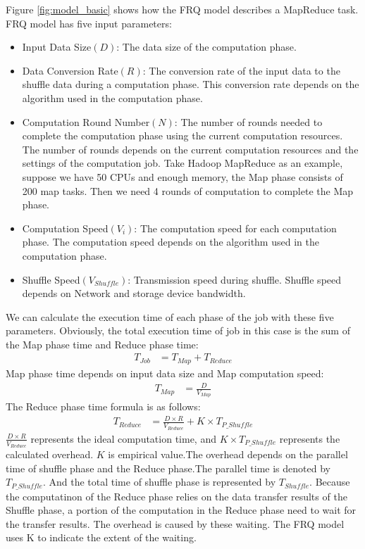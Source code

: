 {Figure \ref{fig:model_basic} shows how the FRQ model describes a MapReduce task. FRQ model has five input parameters:
\begin{itemize}
	\item Input Data Size\((D)\): The data size of the computation phase.
	\item Data Conversion Rate\((R)\): The conversion rate of the input data to the shuffle data during a computation phase. This conversion rate depends on the algorithm used in the computation phase.
    \item Computation Round Number\((N)\): The number of rounds needed to complete the computation phase using the current computation resources. The number of rounds depends on the current computation resources and the settings of the computation job. Take Hadoop MapReduce as an example, suppose we have 50 CPUs and enough memory, the Map phase consists of 200 map tasks. Then we need 4 rounds of computation to complete the Map phase.
    \item Computation Speed\((V_{i})\): 
    The computation speed for each computation phase. The computation speed depends on the algorithm used in the computation phase.
    \item Shuffle Speed\((V_{Shuffle})\): 
    Transmission speed during shuffle. Shuffle speed depends on Network and storage device bandwidth.
\end{itemize}

We can calculate the execution time of each phase of the job with these five parameters. Obviously, the total execution time of job in this case is the sum of the Map phase time and Reduce phase time:
\begin{equation}
\label{equation_Tjob}
\begin{aligned}
    T_{Job} &= T_{Map} + T_{Reduce}
\end{aligned}
\end{equation}
Map phase time depends on input data size and Map computation speed:
\begin{equation}
\label{equation_Tmap}
\begin{aligned}
    T_{Map} &= {{\frac{D}{V_{Map}}}}
\end{aligned}
\end{equation}
The Reduce phase time formula is as follows:
\begin{equation}
\label{equation_Treduce}
\begin{aligned}
    T_{Reduce} &= \frac{D \times R}{V_{Reduce}} + K \times T_{P\_Shuffle}
\end{aligned}
\end{equation}
\(\frac{D \times R}{V_{Reduce}}\) represents the ideal computation time, and \(K \times T_{P\_Shuffle}\) represents the calculated overhead. \(K\) is empirical value.The overhead depends on the parallel time of shuffle phase and the Reduce phase.The parallel time is denoted by \(T_{P\_Shuffle}\). And the total time of shuffle phase is represented by \(T_{Shuffle}\). Because the computatinon of the Reduce phase relies on the data transfer results of the Shuffle phase, a portion of the computation in the Reduce phase need to wait for the transfer results. The overhead is caused by these waiting. The FRQ model uses K to indicate the extent of the waiting.

}
